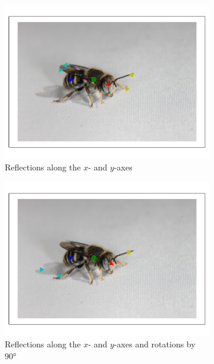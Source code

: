 \documentclass[11pt, oneside]{report}
\begin{document}
\begin{figure}[p]
\begin{subfigure}[b]{0.45\textwidth}
                \centering
                \includegraphics[width=\textwidth]{2refl_1.pdf}
                \caption{Reflections along the $x$- and $y$-axes\\\hspace{0pt}}
            \end{subfigure}
            \begin{subfigure}[b]{0.45\textwidth}
                \centering
                \includegraphics[width=\textwidth]{2reflrot_1.pdf}
                \caption{Reflections along the $x$- and $y$-axes and rotations by 90°}
            \end{subfigure}
            \begin{subfigure}[b]{0.45\textwidth}

\end{subfigure}
\end{figure}
\end{document}
